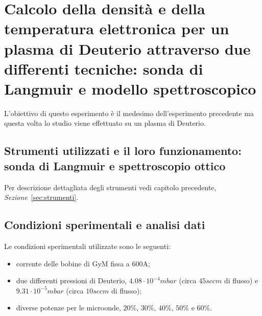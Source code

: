 \chapter{Calcolo della densità e della temperatura elettronica per un plasma di Deuterio attraverso due differenti tecniche: sonda di Langmuir e modello spettroscopico}


L'obiettivo di questo esperimento è il medesimo dell'esperimento precedente ma questa volta lo studio viene effettuato su un plasma di Deuterio.

\section{Strumenti utilizzati e il loro funzionamento: sonda di Langmuir e spettroscopio ottico}
Per descrizione dettagliata degli strumenti vedi capitolo precedente, \textit{Sezione}~\ref{sec:strumenti}.

\section{Condizioni sperimentali e analisi dati}
Le condizioni sperimentali utilizzate sono le seguenti:
\begin{itemize}
 \item corrente delle bobine di GyM fissa a $600\si{\ampere}$;
 \item due differenti pressioni di Deuterio, $4.08\cdot10^{-4}mbar$ (circa $45sccm$ di flusso) e $9.31\cdot10^{-5}mbar$ (circa $10sccm$ di flusso);
 \item diverse potenze per le microonde, $20\%$, $30\%$, $40\%$, $50\%$ e $60\%$.
\end{itemize}


